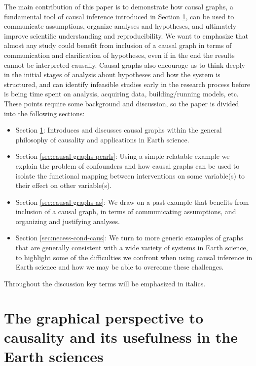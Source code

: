 \documentclass[12pt]{article}
\begin{document}
The main contribution of this paper is to demonstrate how causal
graphs, a fundamental tool of causal inference introduced in Section
\ref{sec:what-caus-caus}, can be used to communicate assumptions,
organize analyses and hypotheses, and ultimately improve scientific understanding and reproducibility. We
want to emphasize that almost any study could benefit from inclusion
of a causal graph in terms of communication and clarification of hypotheses, even if in the end the results cannot be interpreted causally. Causal graphs
also encourage us to think deeply in the initial stages of analysis
about hypotheses and how the system is structured, and can
identify infeasible studies early in the research process before is being time
spent on analysis, acquiring data, building/running models,
etc. These points require some background and discussion, so the
paper is divided into the following sections:

\begin{itemize}
\item Section \ref{sec:what-caus-caus}: Introduces and discusses causal
  graphs within the general philosophy of causality and applications
  in Earth science.
\item Section \ref{sec:causal-graphs-pearls}: Using a simple relatable
  example we explain the problem of confounders and how causal graphs
  can be used to isolate the functional mapping between interventions
  on some variable(s) to their effect on other variable(s).
\item Section \ref{sec:causal-graphs-as}: We draw on a past example
  that benefits from inclusion of a causal graph, in terms of
  communicating assumptions, and organizing and justifying analyses.
\item Section \ref{sec:necess-cond-caus}: We turn to more generic
  examples of graphs that are generally consistent with a wide variety
  of systems in Earth science, to highlight some of the difficulties
  we confront when using causal inference in Earth science and how we
  may be able to overcome these challenges.
\end{itemize}

Throughout the discussion key terms will be emphasized in italics.

\section{The graphical
  perspective to causality and its usefulness in the Earth
  sciences}\label{sec:what-caus-caus}
\end{document}
